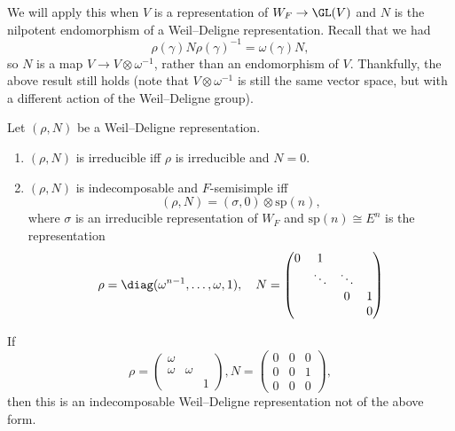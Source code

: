 \documentclass[a4paper]{article}
\renewcommand\sp{\mathrm{sp}}
\begin{document}
We will apply this when $V$ is a representation of $W_F \to \GL(V)$ and $N$ is the nilpotent endomorphism of a Weil--Deligne representation. Recall that we had
\[
  \rho(\gamma) N \rho(\gamma)^{-1} = \omega(\gamma) N,
\]
so $N$ is a map $V \to V \otimes \omega^{-1}$, rather than an endomorphism of $V$. Thankfully, the above result still holds (note that $V \otimes \omega^{-1}$ is still the same vector space, but with a different action of the Weil--Deligne group).

\begin{prop}
  Let $(\rho, N)$ be a Weil--Deligne representation.
  \begin{enumerate}
    \item $(\rho, N)$ is irreducible iff $\rho$ is irreducible and $N = 0$.
    \item $(\rho, N)$ is indecomposable and $F$-semisimple iff
      \[
        (\rho, N) = (\sigma, 0) \otimes \sp(n),
      \]
      where $\sigma$ is an irreducible representation of $W_F$ and $\sp(n) \cong E^n$ is the representation
      \[
        \rho = \diag(\omega^{n - 1}, \ldots, \omega, 1),\quad N =
        \begin{pmatrix}
          0 & 1\\
          & \ddots & \ddots\\
          & & 0 & 1\\
          & & & 0
        \end{pmatrix}
      \]
  \end{enumerate}
\end{prop}

\begin{eg}
  If
  \[
    \rho =
    \begin{pmatrix}
      \omega \\
      \omega & \omega\\
      & & 1
    \end{pmatrix}, N=
    \begin{pmatrix}
      0 & 0 & 0\\
      0 & 0 & 1\\
      0 & 0 & 0
    \end{pmatrix},
  \]
  then this is an indecomposable Weil--Deligne representation not of the above form.
\end{eg}
\end{document}
